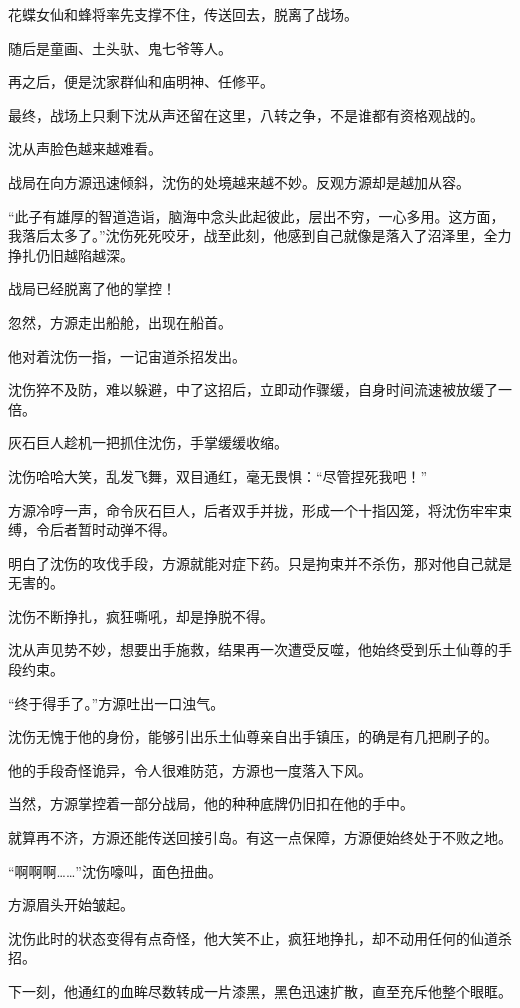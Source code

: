 \begin{this_body}
花蝶女仙和蜂将率先支撑不住，传送回去，脱离了战场。

随后是童画、土头驮、鬼七爷等人。

再之后，便是沈家群仙和庙明神、任修平。

最终，战场上只剩下沈从声还留在这里，八转之争，不是谁都有资格观战的。

沈从声脸色越来越难看。

战局在向方源迅速倾斜，沈伤的处境越来越不妙。反观方源却是越加从容。

“此子有雄厚的智道造诣，脑海中念头此起彼此，层出不穷，一心多用。这方面，我落后太多了。”沈伤死死咬牙，战至此刻，他感到自己就像是落入了沼泽里，全力挣扎仍旧越陷越深。

战局已经脱离了他的掌控！

忽然，方源走出船舱，出现在船首。

他对着沈伤一指，一记宙道杀招发出。

沈伤猝不及防，难以躲避，中了这招后，立即动作骤缓，自身时间流速被放缓了一倍。

灰石巨人趁机一把抓住沈伤，手掌缓缓收缩。

沈伤哈哈大笑，乱发飞舞，双目通红，毫无畏惧：“尽管捏死我吧！”

方源冷哼一声，命令灰石巨人，后者双手并拢，形成一个十指囚笼，将沈伤牢牢束缚，令后者暂时动弹不得。

明白了沈伤的攻伐手段，方源就能对症下药。只是拘束并不杀伤，那对他自己就是无害的。

沈伤不断挣扎，疯狂嘶吼，却是挣脱不得。

沈从声见势不妙，想要出手施救，结果再一次遭受反噬，他始终受到乐土仙尊的手段约束。

“终于得手了。”方源吐出一口浊气。

沈伤无愧于他的身份，能够引出乐土仙尊亲自出手镇压，的确是有几把刷子的。

他的手段奇怪诡异，令人很难防范，方源也一度落入下风。

当然，方源掌控着一部分战局，他的种种底牌仍旧扣在他的手中。

就算再不济，方源还能传送回接引岛。有这一点保障，方源便始终处于不败之地。

“啊啊啊……”沈伤嚎叫，面色扭曲。

方源眉头开始皱起。

沈伤此时的状态变得有点奇怪，他大笑不止，疯狂地挣扎，却不动用任何的仙道杀招。

下一刻，他通红的血眸尽数转成一片漆黑，黑色迅速扩散，直至充斥他整个眼眶。


\end{this_body}
